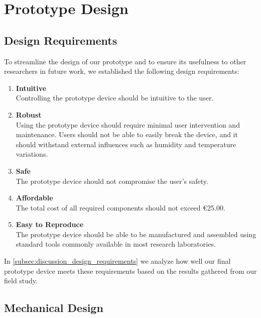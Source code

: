 \section{Prototype Design}\label{sec:prototype_design}

\subsection{Design Requirements}

To streamline the design of our prototype and to ensure its usefulness to other researchers in future work, we established the following design requirements:

\begin{enumerate}[label=\textsf{DRQ\arabic*}, left=1em .. 4.5em]
    \item \textbf{Intuitive}\label{drq:intuitive}\\
        Controlling the prototype device should be intuitive to the user.

    \item \textbf{Robust}\label{drq:robust} \\
        Using the prototype device should require minimal user intervention and maintenance. Users should not be able to easily break the device, and it should withstand external influences such as humidity and temperature variations.

    \item \textbf{Safe}\label{drq:safe}\\
        The prototype device should not compromise the user's safety.

    \item \textbf{Affordable}\label{drq:affordable}\\
        The total cost of all required components should not exceed \euro25.00.

    \item \textbf{Easy to Reproduce}\label{drq:easy_to_reproduce}\\
        The prototype device should be able to be manufactured and assembled using standard tools commonly available in most research laboratories.
\end{enumerate}

\noindent
In \autoref{subsec:discussion_design_requirements} we analyze how well our final prototype device meets these requirements based on the results gathered from our field study.

\subsection{Mechanical Design}


